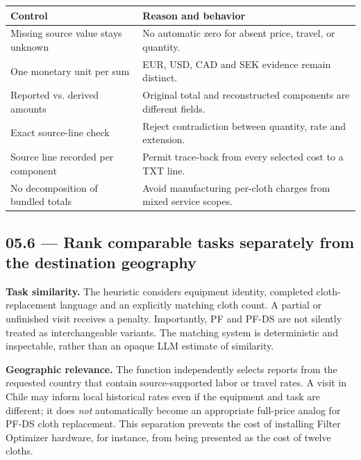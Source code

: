\documentclass[11pt,a4paper]{article}
\DeclareRobustCommand{\code}[1]{{\ttfamily\small\detokenize{#1}}}
\begin{document}
\begin{tabularx}{\textwidth}{@{}L{61mm}Y@{}}
\toprule
\textbf{Control} & \textbf{Reason and behavior}\\
\midrule
Missing source value stays unknown & No automatic zero for absent price, travel, or quantity.\\
One monetary unit per sum & EUR, USD, CAD and SEK evidence remain distinct.\\
Reported vs. derived amounts & Original total and reconstructed components are different fields.\\
Exact source-line check & Reject contradiction between quantity, rate and extension.\\
Source line recorded per component & Permit trace-back from every selected cost to a TXT line.\\
No decomposition of bundled totals & Avoid manufacturing per-cloth charges from mixed service scopes.\\
\bottomrule
\end{tabularx}

\subsection{05.6 --- Rank comparable tasks separately from the destination geography}
\textbf{Task similarity.} The \code{score_task()} heuristic considers equipment identity, completed cloth-replacement language and an explicitly matching cloth count. A partial or unfinished visit receives a penalty. Importantly, PF and PF-DS are not silently treated as interchangeable variants. The matching system is deterministic and inspectable, rather than an opaque LLM estimate of similarity.

\textbf{Geographic relevance.} The \code{historical_local_rates()} function independently selects reports from the requested country that contain source-supported labor or travel rates. A visit in Chile may inform local historical rates even if the equipment and task are different; it does \emph{not} automatically become an appropriate full-price analog for PF-DS cloth replacement. This separation prevents the cost of installing Filter Optimizer hardware, for instance, from being presented as the cost of twelve cloths.
\end{document}
